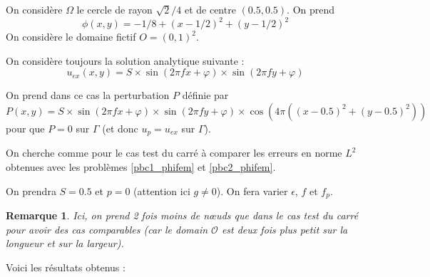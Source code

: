 \documentclass[french]{article}
\newtheorem*{Rem}{Remarque}
\begin{document}
	On considère $\Omega$ le cercle de rayon $\sqrt{2}/4$ et de centre $(0.5,0.5)$. On prend 
	$$\phi(x,y)=-1/8+(x-1/2)^2+(y-1/2)^2$$
	On considère le domaine fictif $O=(0,1)^2$.
	
	On considère toujours la solution analytique suivante :
	$$u_{ex}(x,y) = S\times\sin(2\pi fx + \varphi)\times\sin(2\pi fy + \varphi)$$ 
	
	On prend dans ce cas la perturbation $P$ définie par
	$$P(x,y) = S\times\sin(2\pi fx + \varphi)\times\sin(2\pi fy + \varphi)\times\cos(4\pi((x-0.5)^2+(y-0.5)^2))$$ 
	pour que $P=0$ sur $\Gamma$ (et donc $u_p=u_{ex}$ sur $\Gamma$). 
	
	On cherche comme pour le cas test du carré à comparer les erreurs en norme $L^2$ obtenues avec les problèmes \ref{pbc1_phifem} et \ref{pbc2_phifem}.
	
	On prendra $S=0.5$ et $p=0$ (attention ici $g\ne 0$). On fera varier $\epsilon$, $f$ et $f_p$. 
	
	\begin{Rem}
		Ici, on prend 2 fois moins de nœuds que dans le cas test du carré pour avoir des cas comparables (car le domain $\mathcal{O}$ est deux fois plus petit sur la longueur et sur la largeur).
	\end{Rem}
	
	\newpage
	
	Voici les résultats obtenus :
	
\end{document}
